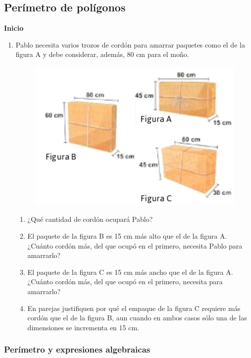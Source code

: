 \documentclass[11pt]{book}
\begin{document}
\subsection{Perímetro de polígonos}
\begin{boxK}
  \begin{center}\textbf{Inicio}\end{center}

  \begin{enumerate}
    \item Pablo necesita varios trozos de cordón para amarrar paquetes como el de la figura A y
          debe considerar, además, 80 cm para el moño.
          \begin{figure}[H]
            \centering
            \includegraphics[width=.6\linewidth]{figuras_cajas.png}
            \label{fig:figuras_cajas}
          \end{figure}
          \begin{enumerate}
            \item ¿Qué cantidad de cordón ocupará Pablo?
            \item El paquete de la figura B es 15 cm más alto que el de la figura A. ¿Cuánto cordón más, del que ocupó en el primero, necesita Pablo para amarrarlo?
            \item El paquete de la figura C es 15 cm más ancho que el de la figura A. ¿Cuánto cordón más, del que ocupó en el primero, necesita para amarrarlo?
            \item En parejas justifiquen por qué el empaque de la figura C requiere más cordón que el de la figura B, aun cuando en ambos casos sólo una de las dimensiones se incrementa en 15 cm.
          \end{enumerate}
  \end{enumerate}
\end{boxK}

\subsubsection{Perímetro y expresiones algebraicas}
\end{document}
